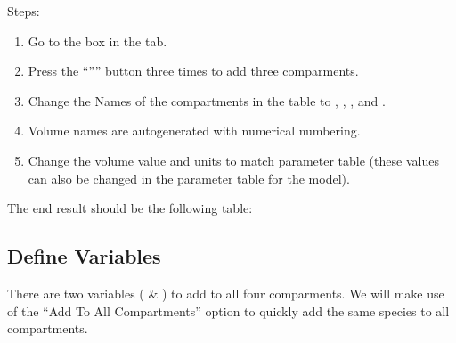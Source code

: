 \documentclass[letterpaper,10pt,english]{sphinxmanual}
\begin{document}
\sphinxAtStartPar
Steps:
\begin{enumerate}
%
\item {} 
\sphinxAtStartPar
Go to the  box in the  tab.

\item {} 
\sphinxAtStartPar
Press the “\sphinxstylestrong{+}”” button three times to add three comparments.

\item {} 
\sphinxAtStartPar
Change the Names of the compartments in the table to ,
, , and .

\item {} 
\sphinxAtStartPar
Volume names are autogenerated with numerical numbering.

\item {} 
\sphinxAtStartPar
Change the volume value and units to match parameter table (these values can
also be changed in the parameter table for the model).

\end{enumerate}

\sphinxAtStartPar
The end result should be the following table:

\begin{figure}[htbp]
\centering

\noindent{}
\end{figure}


\subsection{Define Variables}
\label{\detokenize{pages/tutorial_mc/addSpecies:define-variables}}\label{\detokenize{pages/tutorial_mc/addSpecies::doc}}
\sphinxAtStartPar
There are two variables ( \& ) to add to all four comparments.
We will make use of the “Add To All Compartments” option to quickly add the
same species to all compartments.
\end{document}
